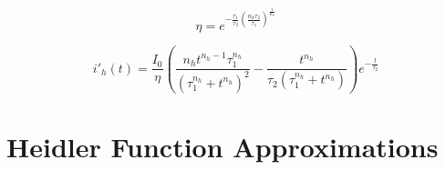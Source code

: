 

\begin{equation}
    \eta =e^{-\frac{\tau _1}{\tau _2} \left(\frac{n_h \tau _2}{\tau _1}\right)^{\frac{1}{n_h}}}
    \label{eqn:eta}
\end{equation}

\begin{equation}
    i'_h \left( t \right) = \frac{I_0}{\eta} \left( \frac{n_h t^{n_h - 1} \tau_1^{n_h}}{\left(\tau_1^{n_h} + t^{n_h} \right)^2} - \frac{t^{n_h}}{\tau_2 \left(\tau_1^{n_h} + t^{n_h} \right)} \right) e^{-\frac{t}{\tau_2}}
    \label{eqn:dHF}
\end{equation}



\section{Heidler Function Approximations}
\label{sec:background_approximations}
